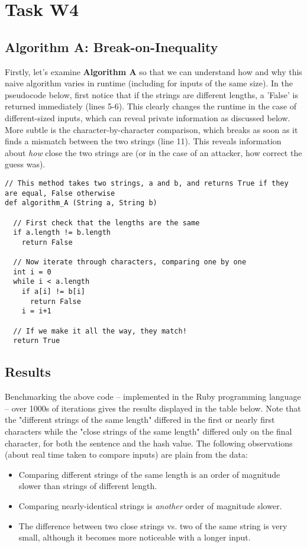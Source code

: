 \documentclass{article}
\providecommand{\tightlist}{
    \setlength{\itemsep}{0pt}\setlength{\parskip}{0pt}
}
\begin{document}
\section{Task W4}
\subsection{Algorithm A: Break-on-Inequality}
Firstly, let's examine \textbf{Algorithm A} so that we can understand how and why this naive algorithm varies in runtime (including for inputs of the same size).
In the pseudocode below, first notice that if the strings are different lengths, a 'False' is returned immediately (lines 5-6).
This clearly changes the runtime in the case of different-sized inputs, which can reveal private information as discussed below.
More subtle is the character-by-character comparison, which breaks as soon as it finds a mismatch between the two strings (line 11). This reveals information about \textit{how} close the two strings are (or in the case of an attacker, how correct the guess was).

\begin{lstlisting}
// This method takes two strings, a and b, and returns True if they are equal, False otherwise
def algorithm_A (String a, String b)

  // First check that the lengths are the same
  if a.length != b.length
    return False

  // Now iterate through characters, comparing one by one
  int i = 0
  while i < a.length
    if a[i] != b[i]
      return False
    i = i+1

  // If we make it all the way, they match!
  return True
\end{lstlisting}


\subsection{Results}
Benchmarking \cite{benchmark} the above code -- implemented in the Ruby programming language -- over 1000s of iterations gives the results displayed in the table below. Note that the "different strings of the same length" differed in the first or nearly first characters while the "close strings of the same length" differed only on the final character, for both the sentence and the hash value. The following observations (about real time taken to compare inputs) are plain from the data:
\begin{itemize}\tightlist
  \item Comparing different strings of the same length is an order of magnitude slower than strings of different length.
  \item Comparing nearly-identical strings is \textit{another} order of magnitude slower.
  \item The difference between two close strings vs. two of the same string is very small, although it becomes more noticeable with a longer input.
\end{itemize}
\end{document}
